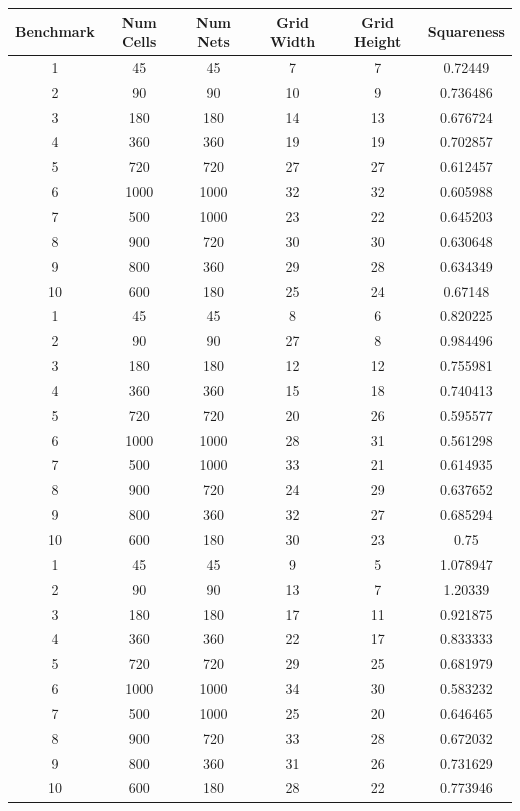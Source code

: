 \documentclass[10pt]{article}
\begin{document}
\begin{table}[H]
    \centering
    \begin{tabular}{cccccc}
        \toprule
        \textbf{Benchmark} & \textbf{Num Cells} & \textbf{Num Nets} & \textbf{Grid Width} & \textbf{Grid Height} & \textbf{Squareness}\\
        \midrule

        1  & 45   & 45   & 7  & 7  & 0.72449 \\
        2  & 90   & 90   & 10 & 9  & 0.736486 \\
        3  & 180  & 180  & 14 & 13 & 0.676724 \\
        4  & 360  & 360  & 19 & 19 & 0.702857 \\
        5  & 720  & 720  & 27 & 27 & 0.612457 \\
        6  & 1000 & 1000 & 32 & 32 & 0.605988 \\
        7  & 500  & 1000 & 23 & 22 & 0.645203 \\
        8  & 900  & 720  & 30 & 30 & 0.630648 \\
        9  & 800  & 360  & 29 & 28 & 0.634349 \\
        10 & 600  & 180  & 25 & 24 & 0.67148 \\
        \midrule

        1  & 45   & 45   & 8  & 6  & 0.820225 \\
        2  & 90   & 90   & 27 & 8  & 0.984496 \\
        3  & 180  & 180  & 12 & 12 & 0.755981 \\
        4  & 360  & 360  & 15 & 18 & 0.740413 \\
        5  & 720  & 720  & 20 & 26 & 0.595577 \\
        6  & 1000 & 1000 & 28 & 31 & 0.561298 \\
        7  & 500  & 1000 & 33 & 21 & 0.614935 \\
        8  & 900  & 720  & 24 & 29 & 0.637652 \\
        9  & 800  & 360  & 32 & 27 & 0.685294 \\
        10 & 600  & 180  & 30 & 23 & 0.75 \\
        \midrule

        1  & 45   & 45   & 9  & 5  & 1.078947 \\
        2  & 90   & 90   & 13 & 7  & 1.20339 \\
        3  & 180  & 180  & 17 & 11 & 0.921875 \\
        4  & 360  & 360  & 22 & 17 & 0.833333 \\
        5  & 720  & 720  & 29 & 25 & 0.681979 \\
        6  & 1000 & 1000 & 34 & 30 & 0.583232 \\
        7  & 500  & 1000 & 25 & 20 & 0.646465 \\
        8  & 900  & 720  & 33 & 28 & 0.672032 \\
        9  & 800  & 360  & 31 & 26 & 0.731629 \\
        10 & 600  & 180  & 28 & 22 & 0.773946 \\
        \midrule


\end{tabular}
\end{table}
\end{document}
